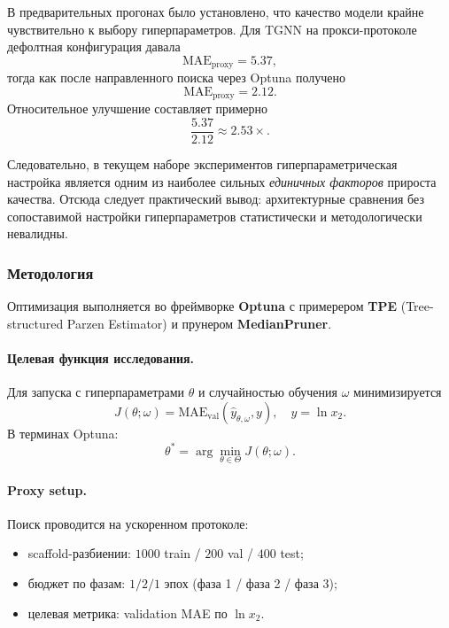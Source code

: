 \documentclass[11pt]{article}
\begin{document}
В предварительных прогонах было установлено, что качество модели крайне чувствительно к выбору гиперпараметров. Для TGNN на прокси-протоколе дефолтная конфигурация давала
\begin{equation*}
\mathrm{MAE}_{\mathrm{proxy}} = 5.37,
\end{equation*}
тогда как после направленного поиска через Optuna получено
\begin{equation*}
\mathrm{MAE}_{\mathrm{proxy}} = 2.12.
\end{equation*}
Относительное улучшение составляет примерно
\begin{equation*}
\frac{5.37}{2.12} \approx 2.53\times.
\end{equation*}

Следовательно, в текущем наборе экспериментов гиперпараметрическая настройка является одним из наиболее сильных \emph{единичных факторов} прироста качества. Отсюда следует практический вывод: архитектурные сравнения без сопоставимой настройки гиперпараметров статистически и методологически невалидны.

\subsubsection{Методология}

Оптимизация выполняется во фреймворке \textbf{Optuna} с примерером \textbf{TPE} (Tree-structured Parzen Estimator) и прунером \textbf{MedianPruner}.

\paragraph{Целевая функция исследования.}
Для запуска с гиперпараметрами $\theta$ и случайностью обучения $\omega$ минимизируется
\begin{equation*}
J(\theta; \omega) = \mathrm{MAE}_{\mathrm{val}}\!\left(\hat y_{\theta,\omega}, y\right),
\quad y = \ln x_2.
\end{equation*}
В терминах Optuna:
\begin{equation*}
\theta^* = \arg\min_{\theta \in \Theta} J(\theta; \omega).
\end{equation*}

\paragraph{Proxy setup.}
Поиск проводится на ускоренном протоколе:
\begin{itemize}
  \item scaffold-разбиении: $1000$ train / $200$ val / $400$ test;
  \item бюджет по фазам: $1/2/1$ эпох (фаза 1 / фаза 2 / фаза 3);
  \item целевая метрика: validation MAE по $\ln x_2$.
\end{itemize}
\end{document}
